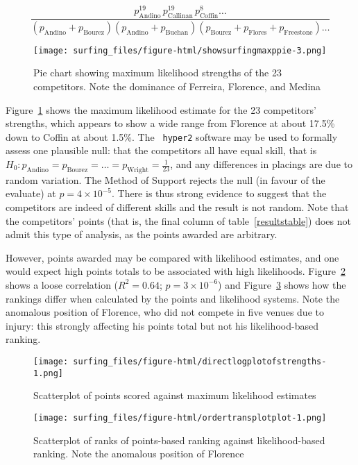 \documentclass{article}
\begin{document}
\begin{equation}
\frac{
p_\mathrm{Andino}^{19}\, p_\mathrm{Callinan}^{19}\, p_\mathrm{Coffin}^{8}\ldots
}{
(p_\mathrm{Andino} + p_\mathrm{Bourez})  (p_\mathrm{Andino} + p_\mathrm{Buchan})(p_\mathrm{Bourez} + p_\mathrm{Flores} + p_\mathrm{Freestone})\ldots
}
\end{equation}

\begin{figure}
\texttt{[image: surfing\_files/figure-html/showsurfingmaxppie-3.png]} %
\caption{Pie chart\label{piechartmax} showing maximum likelihood strengths of the 23 competitors.  Note the
dominance of Ferreira, Florence, and Medina}
\end{figure}

Figure~\ref{piechartmax} shows the maximum likelihood estimate for the
23 competitors' strengths, which appears to show a wide range from
Florence at about 17.5\% down to Coffin at about 1.5\%.  The {\tt
hyper2} software may be used to formally assess one plausible null:
that the competitors all have equal skill, that is $H_0\colon
p_\mathrm{Andino} = p_\mathrm{Bourez}=\ldots=
p_\mathrm{Wright}=\frac{1}{23}$, and any differences in placings are
due to random variation.  The Method of Support \cite{edwards1973}
rejects the null (in favour of the evaluate) at $p=4\times 10^{-5}$.
There is thus strong evidence to suggest that the competitors are
indeed of different skills and the result is not random.  Note that
the competitors' points (that is, the final column of
table~\ref{resultstable}) does not admit this type of analysis, as the
points awarded are arbitrary.

However, points awarded may be compared with likelihood estimates, and
one would expect high points totals to be associated with high
likelihoods.  Figure~\ref{compare_likelihood_points} shows a loose
correlation ($R^2=0.64$; $p=3\times 10^{-6}$) and
Figure~\ref{compare_likelihood_points_rankings} shows how the rankings
differ when calculated by the points and likelihood systems.  Note the
anomalous position of Florence, who did not compete in five venues due
to injury: this strongly affecting his points total but not his
likelihood-based ranking.

\begin{figure}[h]
\texttt{[image: surfing\_files/figure-html/directlogplotofstrengths-1.png]}
\caption{Scatterplot of points scored  \label{compare_likelihood_points} 
against maximum likelihood estimates}
\end{figure}

\begin{figure}[h]
\texttt{[image: surfing\_files/figure-html/ordertransplotplot-1.png]}
\caption{Scatterplot of ranks \label{compare_likelihood_points_rankings} of points-based ranking
against likelihood-based ranking.  Note the anomalous position of
Florence}
\end{figure}




\end{document}
